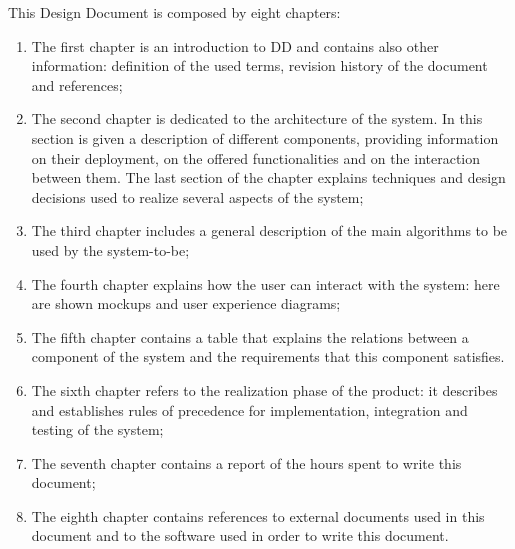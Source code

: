 This Design Document is composed by eight chapters:
\begin{enumerate}
\item The first chapter is an introduction to DD and contains also other information: definition of the used terms, revision history of the document and references;
\item The second chapter is dedicated to the architecture of the system. In this section is given a description of different components, providing information on their deployment, on the offered functionalities and on the interaction between them. The last section of the chapter explains techniques and design decisions used to realize several aspects of the system;
\item The third chapter includes a general description of the main algorithms to be used  by the system-to-be;
\item The fourth chapter explains how the user can interact with the system: here are shown mockups and user experience diagrams;
\item The fifth chapter contains a table that explains the relations between a component of the system and the requirements that this component satisfies.
\item The sixth chapter refers to the realization phase of the product: it describes and establishes rules of precedence for implementation, integration and testing of the system;
\item The seventh chapter contains a report of the hours spent to write this document;
\item The eighth chapter contains references to external documents used in this document and to the software used in order to write this document.
\end{enumerate}
